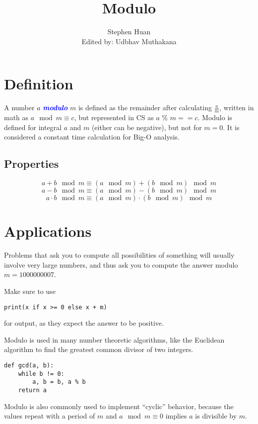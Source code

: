 \documentclass[11pt, oneside]{article}
\title{Modulo}
\author{Stephen Huan \\ Edited by: Udbhav Muthakana}
\newcommand{\emphasis}[1]{\textcolor{blue}{\textbf{\textit{#1}}}}
\begin{document}
\maketitle

\section{Definition}

A number \( a \) \emphasis{modulo} \( m \) is defined as the remainder after calculating \( \frac{a}{m} \),
written in math as \( a \mod m \equiv c \), but represented in CS as \( a \) \(\%\) \( m == c \).
Modulo is defined for integral \( a \) and \( m \) (either can be negative), but not for \( m = 0 \).
It is considered a constant time calculation for Big-O analysis.

\subsection{Properties}

\[ a + b \mod m \equiv (a \mod m) + (b \mod m) \mod m \]
\[ a - b \mod m \equiv (a \mod m) - (b \mod m) \mod m \]
\[ a \cdot b \mod m \equiv (a \mod m) \cdot (b \mod m) \mod m \]

\section{Applications}

Problems that ask you to compute all possibilities of something will usually involve very large numbers,
and thus ask you to compute the answer modulo \( m = 1000000007 \).

\noindent
Make sure to use
\begin{verbatim}
print(x if x >= 0 else x + m)
\end{verbatim}
for output, as they expect the answer to be positive.

Modulo is used in many number theoretic algorithms, like the Euclidean algorithm to find the greatest common divisor of two integers.

\begin{verbatim}
def gcd(a, b):
    while b != 0:
        a, b = b, a % b
    return a
\end{verbatim}

Modulo is also commonly used to implement ``cyclic'' behavior, because the values repeat with a period
of \( m \) and \( a \mod m \equiv 0 \) implies \( a \) is divisible by \( m \).
\end{document}

